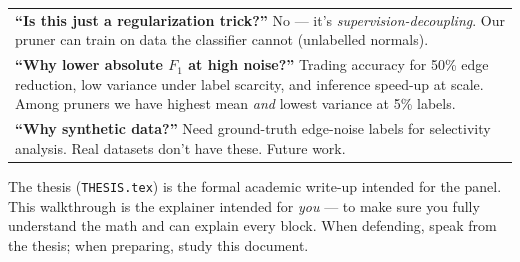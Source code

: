 \documentclass[11pt,a4paper]{article}
\begin{document}
\begin{tabular}{p{}}
\textbf{``Is this just a regularization trick?''} No --- it's
\emph{supervision-decoupling}. Our pruner can train on data the
classifier cannot (unlabelled normals).\\
\textbf{``Why lower absolute $F_1$ at high noise?''} Trading accuracy for
50\% edge reduction, low variance under label scarcity, and inference
speed-up at scale. Among pruners we have highest mean \emph{and} lowest
variance at 5\% labels.\\
\textbf{``Why synthetic data?''} Need ground-truth edge-noise labels
for selectivity analysis. Real datasets don't have these. Future work.\\
\bottomrule
\end{tabular}

\vspace{1em}
\begin{notebox}
The thesis (\texttt{THESIS.tex}) is the formal academic write-up
intended for the panel. This walkthrough is the explainer intended
for \emph{you} --- to make sure you fully understand the math and can
explain every block. When defending, speak from the thesis; when
preparing, study this document.
\end{notebox}
\end{document}
